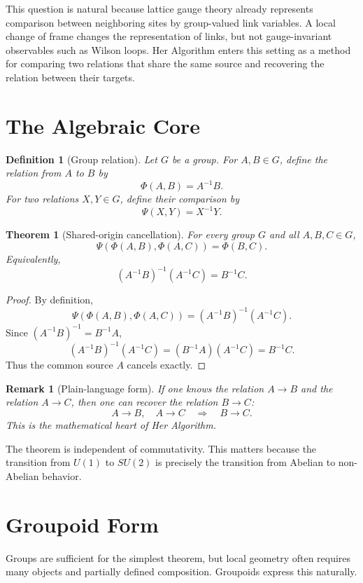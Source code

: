 \documentclass[11pt]{article}
\newtheorem{theorem}{Theorem}
\newtheorem{definition}{Definition}
\newtheorem{remark}{Remark}
\newcommand{\HA}{Her Algorithm}
\newcommand{\Uone}{U(1)}
\newcommand{\Sutwo}{SU(2)}
\begin{document}
This question is natural because lattice gauge theory already represents comparison between neighboring sites by group-valued link variables.  A local change of frame changes the representation of links, but not gauge-invariant observables such as Wilson loops.  \HA{} enters this setting as a method for comparing two relations that share the same source and recovering the relation between their targets.

\section{The Algebraic Core}

\begin{definition}[Group relation]
Let \(G\) be a group.  For \(A,B\in G\), define the relation from \(A\) to \(B\) by
\[
\Phi(A,B)=A^{-1}B.
\]
For two relations \(X,Y\in G\), define their comparison by
\[
\Psi(X,Y)=X^{-1}Y.
\]
\end{definition}

\begin{theorem}[Shared-origin cancellation]
For every group \(G\) and all \(A,B,C\in G\),
\[
\Psi(\Phi(A,B),\Phi(A,C))=\Phi(B,C).
\]
Equivalently,
\[
(A^{-1}B)^{-1}(A^{-1}C)=B^{-1}C.
\]
\end{theorem}

\begin{proof}
By definition,
\[
\Psi(\Phi(A,B),\Phi(A,C))=(A^{-1}B)^{-1}(A^{-1}C).
\]
Since \((A^{-1}B)^{-1}=B^{-1}A\),
\[
(A^{-1}B)^{-1}(A^{-1}C)=(B^{-1}A)(A^{-1}C)=B^{-1}C.
\]
Thus the common source \(A\) cancels exactly.
\end{proof}

\begin{remark}[Plain-language form]
If one knows the relation \(A\to B\) and the relation \(A\to C\), then one can recover the relation \(B\to C\):
\[
\boxed{A\to B,\quad A\to C\quad \Longrightarrow \quad B\to C.}
\]
This is the mathematical heart of \HA{}.
\end{remark}

The theorem is independent of commutativity.  This matters because the transition from \(\Uone\) to \(\Sutwo\) is precisely the transition from Abelian to non-Abelian behavior.

\section{Groupoid Form}

Groups are sufficient for the simplest theorem, but local geometry often requires many objects and partially defined composition.  Groupoids express this naturally.
\end{document}
